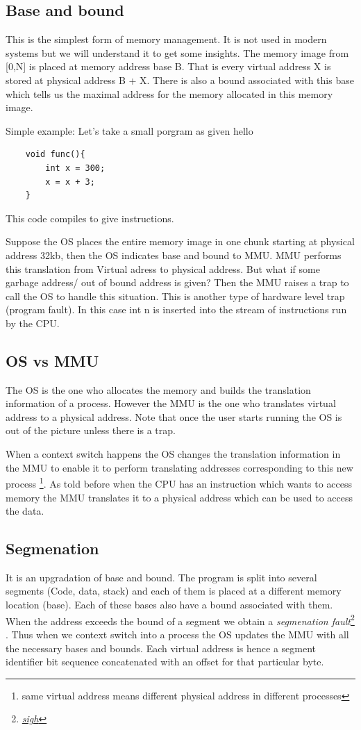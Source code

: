 \documentclass[12pt]{article}
\begin{document}
\subsection{Base and bound}
This is the simplest form of memory management. It is not used in modern systems but we will understand it to get some insights. The memory image
from [0,N] is placed at memory address base B. That is every virtual address X is stored at physical address B + X. There is also a bound associated with this base which tells us 
the maximal address for the memory allocated in this memory image.



Simple example: Let's take a small porgram as given hello

\begin{lstlisting}
    void func(){
        int x = 300;
        x = x + 3;
    }
\end{lstlisting}
This code compiles to give instructions. 

Suppose the OS places the entire memory image in one chunk starting at physical address 32kb, then the OS indicates base and bound to MMU. 
MMU performs this translation from Virtual adress to physical address. But what if some garbage address/ out of bound address is given? Then the
MMU raises a trap to call the OS to handle this situation. This is another type of hardware level trap (program fault). In this case int n is inserted into the 
stream of instructions run by the CPU. 

\subsection{OS vs MMU}
The OS is the one who allocates the memory and builds the translation information of a process. However the MMU
is the one who translates virtual address to a physical address. Note that once the user starts running the OS is out of the picture unless there is a trap.

When a context switch happens the OS changes the translation information in the MMU to enable it to perform translating addresses corresponding to this new process \footnote{same virtual address means different physical address in different processes}. 
As told before when the CPU has an instruction which wants to access memory the MMU translates it to a physical address which can be used to access the data.

\subsection{Segmenation}
It is an upgradation of base and bound. The program is split into several segments (Code, data, stack) and each of them is placed at a different memory location (base).
Each of these bases also have a bound associated with them. When the address exceeds the bound of a segment we obtain a \textit{segmenation fault}\footnote{\href{https://www.youtube.com/watch?v=NAEppFUWLfc}{\textit{sigh}}}
. Thus when we context switch into a process the OS updates the MMU with all the necessary bases and bounds.
Each virtual address is hence a segment identifier bit sequence concatenated with an offset for that particular byte.
\end{document}
